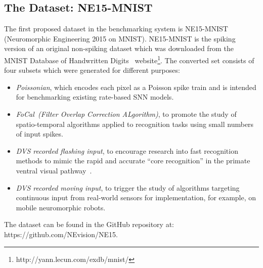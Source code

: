 \subsection{The Dataset: NE15-MNIST}
\label{sec:data}
The first proposed dataset in the benchmarking system is NE15-MNIST (Neuromorphic Engineering 2015 on MNIST).
NE15-MNIST is the spiking version of an original non-spiking dataset which was downloaded from the MNIST Database of Handwritten Digits~\cite{lecun1998gradient}  website\footnote{http://yann.lecun.com/exdb/mnist/}. The converted set consists of four subsets which were generated for different purposes:
\begin{itemize}
	\item \textit{Poissonian},
	which encodes each pixel as a Poisson spike train and is intended for benchmarking existing rate-based SNN models.
	\item \textit{FoCal~(Filter Overlap Correction ALgorithm)},
	to promote the study of spatio-temporal algorithms applied to recognition tasks using small numbers of input spikes.
	\item \textit{DVS recorded flashing input},
	to encourage research into fast recognition methods to mimic the rapid and accurate ``core recognition'' in the primate ventral visual pathway~\cite{dicarlo2012does}.
	\item \textit{DVS recorded moving input},
	to trigger the study of algorithms targeting continuous input from real-world sensors for implementation, for example, on mobile neuromorphic robots.
\end{itemize}
The dataset can be found in the GitHub repository at: https://github.com/NEvision/NE15.
